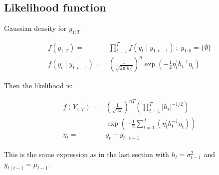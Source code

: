 \subsection{Likelihood function}

Gaussian density for $y_{1:T}$

\begin{align*}
    f\left(y_{1: T}\right)=&\prod_{t=1}^T f\left(y_t \mid y_{1: t-1}\right) \: ; \: y_{1: 0}=\{\emptyset\} \\
    f\left(y_t \mid y_{1: t-1}\right)=&\left(\frac{1}{\sqrt{2 \pi\left|h_t\right|}}\right)^n \exp \left(-\frac{1}{2} \eta_t^{\prime} h_t^{-1} \eta_t\right)
\end{align*}


Then the likelihood is:

\begin{align*}
    f\left(Y_{1: T}\right)=&\left(\frac{1}{\sqrt{2 \pi}}\right)^{n T}\left(\prod_{t=1}^T\left|h_t\right|^{-1 / 2}\right) \\
    &\exp \left(-\frac{1}{2} \sum_{t=1}^T\left(\eta_t^{\prime} h_t^{-1} \eta_t\right)\right) \\
    \eta_t=&y_t-y_{t \mid t-1}
\end{align*}

This is the same expression as in the last section with $h_t=\sigma_{t-1}^2$ and $y_{t \mid t-1}=\mu_{t-1}$.